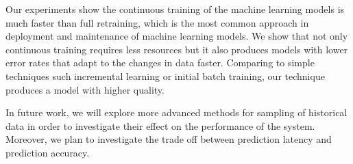 \documentclass{vldb}
\begin{document}
Our experiments show the continuous training of the machine learning models is much faster than full retraining, which is the most common approach in deployment and maintenance of machine learning models. 
We show that not only continuous training requires less resources but it also produces models with lower error rates that adapt to the changes in data faster.
Comparing to simple techniques such incremental learning or initial batch training, our technique produces a model with higher quality.

{\color{green}In future work, we will explore more advanced methods for sampling of historical data in order to investigate their effect on the performance of the system. Moreover, we plan to investigate the trade off between prediction latency and prediction accuracy.}



{\fontsize{8}{4}\selectfont }
\end{document}
